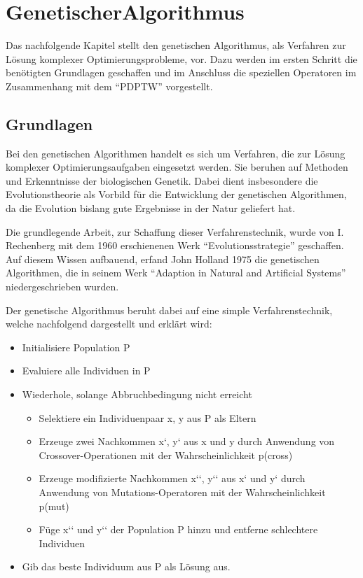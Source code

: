 \section{GenetischerAlgorithmus}
Das nachfolgende Kapitel stellt den genetischen Algorithmus, als Verfahren zur Lösung komplexer Optimierungsprobleme, vor. Dazu werden im ersten Schritt die benötigten Grundlagen geschaffen und im Anschluss die speziellen Operatoren im Zusammenhang mit dem "`PDPTW"' vorgestellt. 

\subsection{Grundlagen}
Bei den genetischen Algorithmen handelt es sich um Verfahren, die zur Lösung komplexer Optimierungsaufgaben eingesetzt werden. Sie beruhen auf Methoden und Erkenntnisse der biologischen Genetik. Dabei dient insbesondere die Evolutionstheorie als Vorbild für die Entwicklung der genetischen Algorithmen, da die Evolution bislang gute Ergebnisse in der Natur geliefert hat. \cite{jih2004family} \cite{bortfeldtplanen}

Die grundlegende Arbeit, zur Schaffung dieser Verfahrenstechnik, wurde von I. Rechenberg mit dem 1960 erschienenen Werk "`Evolutionsstrategie"' geschaffen. Auf diesem Wissen aufbauend, erfand John Holland 1975 die genetischen Algorithmen, die in seinem Werk "`Adaption in Natural and Artificial Systems"' niedergeschrieben wurden.

Der genetische Algorithmus beruht dabei auf eine simple Verfahrenstechnik, welche nachfolgend dargestellt und erklärt wird:
\begin{itemize}
 \item Initialisiere Population P
 \item Evaluiere alle Individuen in P
 \item Wiederhole, solange Abbruchbedingung nicht erreicht
 \begin{itemize}
  \item Selektiere ein Individuenpaar x, y aus P als Eltern
  \item Erzeuge zwei Nachkommen x‘, y‘ aus x und y durch Anwendung von Crossover-Operationen mit der Wahrscheinlichkeit p(cross)
  \item Erzeuge modifizierte Nachkommen x‘‘, y‘‘ aus x‘ und y‘ durch Anwendung von Mu\-ta\-tions-Operatoren mit der Wahrscheinlichkeit p(mut)
  \item Füge x‘‘ und y‘‘ der Population P hinzu und entferne schlechtere Individuen
 \end{itemize}
 \item Gib das beste Individuum aus P als Lösung aus.
\end{itemize}


